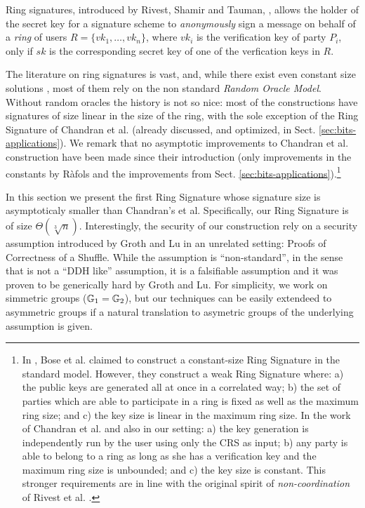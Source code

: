 Ring signatures, introduced by Rivest, Shamir and Tauman, \cite{AC:RivShaTau01}, allows the holder of the secret key for a signature scheme to \emph{anonymously} sign a message on behalf of a \emph{ring} of users $R=\{vk_1,\ldots,vk_n\}$, where $vk_i$ is the verification key of party $P_i$, only if $sk$ is the corresponding secret key of one of the verfication keys in $R$.

The literature on ring signatures is vast, and, while there exist even constant size solutions \cite{EC:DKNS04}, most of them rely on the non standard \emph{Random Oracle Model}. Without random oracles the history is not so nice: most of the constructions have signatures of size linear in the size of the ring, with the sole exception of the Ring Signature of Chandran et al. \cite{ICALP:ChaGroSah07} (already discussed, and optimized, in Sect. \ref{sec:bits-applications}). We remark that no asymptotic improvements to Chandran et al. construction have been made since their introduction (only improvements in the constants by R\`afols \cite{TCC:Rafols15} and the improvements from Sect. \ref{sec:bits-applications}).\footnote{In \cite{ACISP:BosDasRan15}, Bose et al. claimed to construct a constant-size Ring Signature in the standard model. However, they construct a weak Ring Signature where: a) the public keys are generated all at once in a correlated way; b) the set of parties which are able to participate in a ring is fixed as well as the maximum ring size; and c) the key size is linear in the maximum ring size. In the work of Chandran et al. and also in our setting: a) the key generation is independently run by the user using only the CRS as input; b) any party is able to belong to a ring as long as she has a verification key and the maximum ring size is unbounded; and c) the key size is constant. This stronger requirements are in line with the original spirit of \emph{non-coordination} of  Rivest et al. \cite{AC:RivShaTau01}.}

In this section we present the first Ring Signature whose signature size is asymptoticaly smaller than Chandran's et al. Specifically, our Ring Signature is of size $\Theta(\sqrt[3]{n})$. Interestingly, the security of our construction rely on a security assumption introduced by Groth and Lu \cite{AC:GroLu07} in an unrelated setting: Proofs of Correctness of a Shuffle. While the assumption is ``non-standard'', in the sense that is not a ``DDH like'' assumption, it is a falsifiable assumption and it was proven to be generically hard by Groth and Lu. For simplicity, we work on simmetric groups ($\mathbb{G}_1=\mathbb{G}_2$), but our techniques can be easily extendeed to asymmetric groups if a natural translation to asymetric groups of the underlying assumption is given. 

